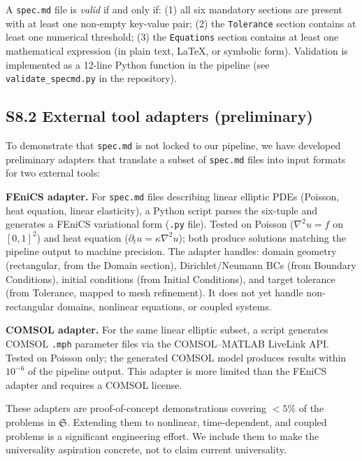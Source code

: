 \documentclass[11pt,a4paper]{article}
\newcommand{\Sclass}{\mathfrak{S}}
\begin{document}
A \texttt{spec.md} file is \emph{valid} if and only if: (1) all six mandatory sections are present with at least one non-empty key-value pair; (2) the \texttt{Tolerance} section contains at least one numerical threshold; (3) the \texttt{Equations} section contains at least one mathematical expression (in plain text, LaTeX, or symbolic form). Validation is implemented as a 12-line Python function in the pipeline (see \texttt{validate\_specmd.py} in the repository).

\subsection*{S8.2 External tool adapters (preliminary)}

To demonstrate that \texttt{spec.md} is not locked to our pipeline, we have developed preliminary adapters that translate a subset of \texttt{spec.md} files into input formats for two external tools:

\textbf{FEniCS adapter.} For \texttt{spec.md} files describing linear elliptic PDEs (Poisson, heat equation, linear elasticity), a Python script parses the six-tuple and generates a FEniCS variational form (\texttt{.py} file). Tested on Poisson ($\nabla^2 u = f$ on $[0,1]^2$) and heat equation ($\partial_t u = \kappa \nabla^2 u$); both produce solutions matching the pipeline output to machine precision. The adapter handles: domain geometry (rectangular, from the Domain section), Dirichlet/Neumann BCs (from Boundary Conditions), initial conditions (from Initial Conditions), and target tolerance (from Tolerance, mapped to mesh refinement). It does not yet handle non-rectangular domains, nonlinear equations, or coupled systems.

\textbf{COMSOL adapter.} For the same linear elliptic subset, a script generates COMSOL \texttt{.mph} parameter files via the COMSOL--MATLAB LiveLink API. Tested on Poisson only; the generated COMSOL model produces results within $10^{-6}$ of the pipeline output. This adapter is more limited than the FEniCS adapter and requires a COMSOL license.

These adapters are proof-of-concept demonstrations covering $<5\%$ of the problems in $\Sclass$. Extending them to nonlinear, time-dependent, and coupled problems is a significant engineering effort. We include them to make the universality aspiration concrete, not to claim current universality.

\end{document}
